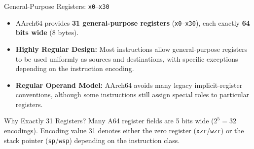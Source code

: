 \documentclass[aspectratio=169,11pt,t,xcolor=table]{beamer}
\newcommand{\key}[1]{\textbf{#1}}
\newcommand{\bits}[1]{\texttt{#1}}
\begin{document}
\begin{frame}{General-Purpose Registers: \texttt{x0}--\texttt{x30}}
\vfill
\begin{itemize}\setlength{\itemsep}{4pt}
  \item AArch64 provides \key{31 general-purpose registers} (\bits{x0}--\bits{x30}), each exactly \key{64 bits wide} ($8\text{ bytes}$).
  \item \key{Highly Regular Design:} Most instructions allow general-purpose registers to be used uniformly as sources and destinations, with specific exceptions depending on the instruction encoding.
  \item \key{Regular Operand Model:} AArch64 avoids many legacy implicit-register conventions, although some instructions still assign special roles to particular registers.
\end{itemize}

\vfill
\centering
{}

\vfill
\begin{block}{Why Exactly 31 Registers?}
\small Many A64 register fields are 5 bits wide ($2^5 = 32$ encodings). Encoding value 31 denotes either the zero register (\bits{xzr}/\bits{wzr}) or the stack pointer (\bits{sp}/\bits{wsp}) depending on the instruction class.
\end{block}
\vfill
\end{frame}









\end{document}
